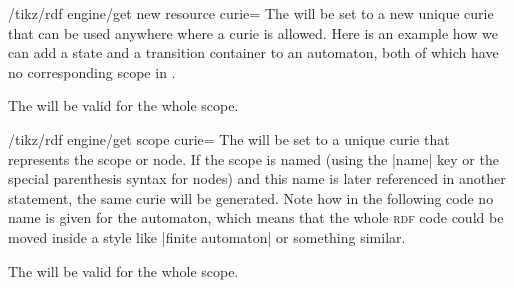 \begin{key}{/tikz/rdf engine/get new resource curie=}
  The  will be set to a new unique curie that can be used
  anywhere where a curie is allowed. Here is an example how we can add
  a state and a transition container to an automaton, both of which
  have no corresponding scope in \tikzname.
\begin{codeexample}
\end{codeexample}
  The  will be valid for the whole scope.
\end{key}

\begin{key}{/tikz/rdf engine/get scope curie=}
  The  will be set to a unique curie that represents the
  scope or node. If the scope is named (using the |name| key or the
  special parenthesis syntax for nodes) and this name is later
  referenced in another statement, the same curie will be
  generated. Note how in the following code no name is given for the
  automaton, which means that the whole \textsc{rdf} code could be
  moved inside a style like |finite automaton| or something similar. 
\begin{codeexample}
\end{codeexample}
  The  will be valid for the whole scope.
\end{key}

